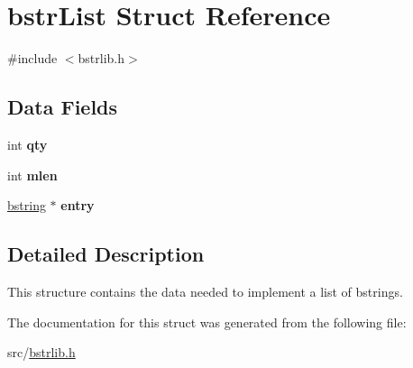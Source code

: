 \hypertarget{structbstrList}{}\section{bstr\+List Struct Reference}
\label{structbstrList}


{\ttfamily \#include $<$bstrlib.\+h$>$}

\subsection*{Data Fields}
\begin{DoxyCompactItemize}
\item 
\hypertarget{structbstrList_a23465fcc1c43891c136fead866a30a0e}{}int {\bfseries qty}\label{structbstrList_a23465fcc1c43891c136fead866a30a0e}

\item 
\hypertarget{structbstrList_a27cec944f3421d6faaaaca651391eeb3}{}int {\bfseries mlen}\label{structbstrList_a27cec944f3421d6faaaaca651391eeb3}

\item 
\hypertarget{structbstrList_adab677d642e53205ebee8fd432977afc}{}\hyperlink{structtagbstring}{bstring} $\ast$ {\bfseries entry}\label{structbstrList_adab677d642e53205ebee8fd432977afc}

\end{DoxyCompactItemize}


\subsection{Detailed Description}
This structure contains the data needed to implement a list of bstrings. 

The documentation for this struct was generated from the following file\+:\begin{DoxyCompactItemize}
\item 
src/\hyperlink{bstrlib_8h}{bstrlib.\+h}\end{DoxyCompactItemize}
